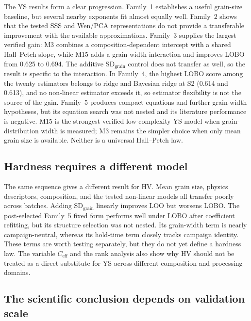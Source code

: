 \documentclass[5p,times,twocolumn]{elsarticle}
\begin{document}
The YS results form a clear progression. Family~1 establishes a useful grain-size baseline, but several nearby exponents fit almost equally well. Family~2 shows that the tested SSS and Wen/PCA representations do not provide a transferable improvement with the available approximations. Family~3 supplies the largest verified gain: M3 combines a composition-dependent intercept with a shared Hall--Petch slope, while M15 adds a grain-width interaction and improves LOBO from 0.625 to 0.694. The additive $\mathrm{SD}_{\mathrm{grain}}$ control does not transfer as well, so the result is specific to the interaction. In Family~4, the highest LOBO score among the twenty estimators belongs to ridge and Bayesian ridge at S2 (0.614 and 0.613), and no non-linear estimator exceeds it, so estimator flexibility is not the source of the gain. Family~5 produces compact equations and further grain-width hypotheses, but its equation search was not nested and its literature performance is negative. M15 is the strongest verified low-complexity YS model when grain-distribution width is measured; M3 remains the simpler choice when only mean grain size is available. Neither is a universal Hall--Petch law.

\subsection{Hardness requires a different model}

The same sequence gives a different result for HV. Mean grain size, physics descriptors, composition, and the tested non-linear models all transfer poorly across batches. Adding $\mathrm{SD}_{\mathrm{grain}}$ linearly improves LOO but worsens LOBO. The post-selected Family~5 fixed form performs well under LOBO after coefficient refitting, but its structure selection was not nested. Its grain-width term is nearly campaign-neutral, whereas its hold-time term closely tracks campaign identity. These terms are worth testing separately, but they do not yet define a hardness law. The variable $C_{\mathrm{eff}}$ and the rank analysis also show why HV should not be treated as a direct substitute for YS across different composition and processing domains.

\subsection{The scientific conclusion depends on validation scale}
\end{document}
